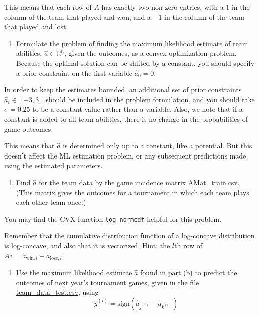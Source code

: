 \documentclass[
  letterpaper,
  DIV=11,
  numbers=noendperiod]{scrartcl}
\providecommand{\tightlist}{%
  \setlength{\itemsep}{0pt}\setlength{\parskip}{0pt}}\usepackage{longtable,booktabs,array}
\begin{document}
This means that each row of \(A\) has exactly two non-zero entries, with
a \(1\) in the column of the team that played and won, and a \(-1\) in
the column of the team that played and lost.

\begin{enumerate}
\def\labelenumi{(\alph{enumi})}
\tightlist
\item
  Formulate the problem of finding the maximum likelihood estimate of
  team abilities, \(\hat{a} \in \mathbb{R}^n\), given the outcomes, as a
  convex optimization problem. Because the optimal solution can be
  shifted by a constant, you should specify a prior constraint on the
  first variable \(\hat{a}_0 = 0\).
\end{enumerate}

In order to keep the estimates bounded, an additional set of prior
constraints \(\hat{a}_i \in [-3, 3]\) should be included in the problem
formulation, and you should take \(\sigma = 0.25\) to be a constant
value rather than a variable. Also, we note that if a constant is added
to all team abilities, there is no change in the probabilities of game
outcomes.

This means that \(\hat{a}\) is determined only up to a constant, like a
potential. But this doesn't affect the ML estimation problem, or any
subsequent predictions made using the estimated parameters.

\begin{enumerate}
\def\labelenumi{(\alph{enumi})}
\setcounter{enumi}{1}
\tightlist
\item
  Find \(\hat{a}\) for the team data by the game incidence matrix
  \href{https://github.com/georgehagstrom/DATA609Spring2025/blob/main/website/assignments/labs/labData/AMat_train.csv}{AMat\_train.csv}.
  (This matrix gives the outcomes for a tournament in which each team
  plays each other team once.)
\end{enumerate}

You may find the CVX function \texttt{log\_normcdf} helpful for this
problem.

Remember that the cumulative distribution function of a log-concave
distribution is log-concave, and also that it is vectorized. Hint: the
\(l\)th row of \(A\mathrm{a} =a_{\mathrm{win},l}-a_{\mathrm{lose},l}\).

\begin{enumerate}
\def\labelenumi{(\alph{enumi})}
\setcounter{enumi}{2}
\tightlist
\item
  Use the maximum likelihood estimate \(\hat{a}\) found in part (b) to
  predict the outcomes of next year's tournament games, given in the
  file
  \href{https://github.com/georgehagstrom/DATA609Spring2025/blob/main/website/assignments/labs/labData/team_data_test.csv}{team\_data\_test.csv},
  using \[
  \hat{y}^{(i)} = \mathrm{sign}(\hat{a}_{j^{(i)}} − \hat{a}_{k^{(i)}})
  \]
\end{enumerate}
\end{document}
